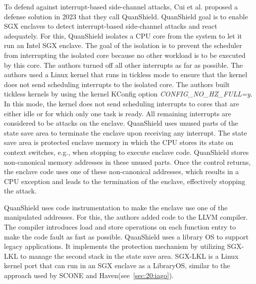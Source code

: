 To defend against interrupt-based side-channel attacks, Cui et al. proposed a defense solution in 2023 that they call
QuanShield.\cite{cui_quanshield_2023} QuanShield goal is to enable SGX enclaves to detect interrupt-based side-channel
attacks and react adequately. For this, QuanShield isolates a CPU core from the system to let it run
an Intel SGX enclave. The goal of the isolation is to prevent the scheduler from interrupting the isolated core because
no other workload is to be executed by this core. The authors turned off all other interrupts as far as possible. The
authors used a Linux kernel that runs in tickless mode to ensure that the kernel does not send scheduling interrupts to
the isolated core. The authors built tickless kernels by using the kernel KConfig option
\textit{CONFIG\_NO\_HZ\_FULL=y}. In this mode, the kernel does not send scheduling interrupts to cores that are either
idle or for which only one task is ready. All remaining interrupts are considered to be attacks on the enclave.
QuanShield uses unused parts of the state save area to terminate the enclave upon receiving any interrupt. The state
save area is protected enclave memory in which the CPU stores its state on context switches, e.g., when stopping to
execute enclave code. QuanShield stores non-canonical memory addresses in these unused parts. Once the control returns,
the enclave code uses one of these non-canonical addresses, which results in a CPU exception and leads to the
termination of the enclave, effectively stopping the attack.

QuanShield uses code instrumentation to make the enclave use one of the manipulated addresses. For this, the authors
added code to the LLVM compiler. The compiler introduces load and store operations on each function entry to make the
code fault as fast as possible. QuanShield uses a library OS to support legacy applications. It implements the
protection mechanism by utilizing SGX-LKL to manage the second stack in the state save area. SGX-LKL is a Linux kernel
port that can run in an SGX enclave as a LibraryOS, similar to the approach used by SCONE and
Haven(see~\ref{sec:20:iago}).\cite{priebe2019sgx}
